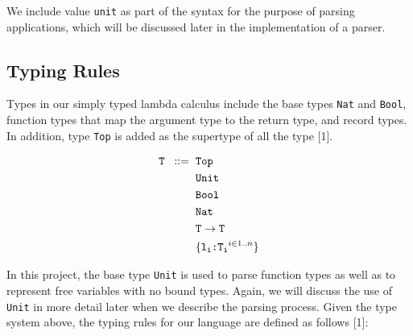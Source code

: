 \documentclass[fleqn, 11pt]{article}
\begin{document}
We include value \texttt{unit} as part of the syntax for the purpose of parsing applications, which will be discussed later in the 
implementation of a parser.

\subsection{Typing Rules}

Types in our simply typed lambda calculus include the base types \texttt{Nat} and \texttt{Bool}, function types that map the argument type to 
the return type, and record types. In addition, type \texttt{Top} is added as the supertype of all the type [1].

\begin{align*}
    \texttt{T} \hspace{2mm} ::= \hspace{2mm} &\texttt{Top} \\
                                             &\texttt{Unit} \\
                                             &\texttt{Bool} \\
                                             &\texttt{Nat} \\
                                             &\texttt{T} \rightarrow \texttt{T} \\
                                             &\{\texttt{l\textsubscript{i}:T\textsubscript{i}}^{i \in 1..n}\} 
\end{align*}

In this project, the base type \texttt{Unit} is used to parse function types as well as to represent free variables with no bound types.  
Again, we will discuss the use of \texttt{Unit} in more detail later when we describe the parsing process. Given the type system above, 
the typing rules for our language are defined as follows [1]:
\end{document}
